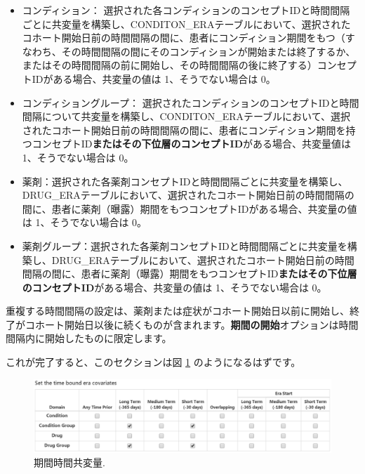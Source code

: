 \documentclass[
  11pt]{book}
\theoremstyle{definition}
\theoremstyle{definition}
\theoremstyle{definition}
\theoremstyle{definition}
\theoremstyle{remark}
\begin{document}
\begin{itemize}
\item
  コンディション： 選択された各コンディションのコンセプトIDと時間間隔ごとに共変量を構築し、CONDITON\_ERAテーブルにおいて、選択されたコホート開始日前の時間間隔の間に、患者にコンディション期間をもつ（すなわち、その時間間隔の間にそのコンディションが開始または終了するか、またはその時間間隔の前に開始し、その時間間隔の後に終了する）コンセプトIDがある場合、共変量の値は 1、そうでない場合は 0。
\item
  コンディショングループ： 選択されたコンディションのコンセプトIDと時間間隔について共変量を構築し、CONDITON\_ERAテーブルにおいて、選択されたコホート開始日前の時間間隔の間に、患者にコンディション期間を持つコンセプトID\textbf{またはその下位層のコンセプトID}がある場合、共変量値は 1、そうでない場合は 0。
\item
  薬剤：選択された各薬剤コンセプトIDと時間間隔ごとに共変量を構築し、DRUG\_ERAテーブルにおいて、選択されたコホート開始日前の時間間隔の間に、患者に薬剤（曝露）期間をもつコンセプトIDがある場合、共変量の値は 1、そうでない場合は 0。
\item
  薬剤グループ：選択された各薬剤コンセプトIDと時間間隔ごとに共変量を構築し、DRUG\_ERAテーブルにおいて、選択されたコホート開始日前の時間間隔の間に、患者に薬剤（曝露）期間をもつコンセプトID\textbf{またはその下位層のコンセプトID}がある場合、共変量の値は 1、そうでない場合は 0。
\end{itemize}

重複する時間間隔の設定は、薬剤または症状がコホート開始日以前に開始し、終了がコホート開始日以後に続くものが含まれます。\textbf{期間の開始}オプションは時間間隔内に開始したものに限定します。

これが完了すると、このセクションは図 \ref{fig:covariateSettings4} のようになるはずです。

\begin{figure}

{\centering \includegraphics[width=1\linewidth]{images/PatientLevelPrediction/covariateSettings4} 

}

\caption{期間時間共変量.}\label{fig:covariateSettings4}
\end{figure}
\end{document}
